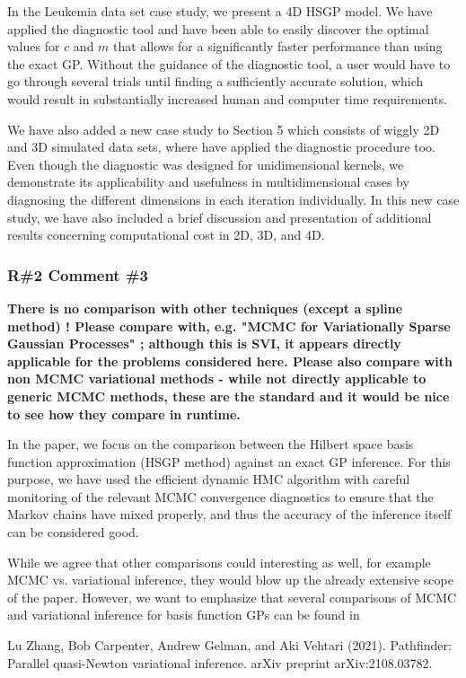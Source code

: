 \documentclass[11pt]{report}
\begin{document}
In the Leukemia data set case study, we present a 4D HSGP model. We have applied the diagnostic tool and have been able to easily discover the optimal values for $c$ and $m$ that allows for a significantly faster performance than using the exact GP. Without the guidance of the diagnostic tool, a user would have to go through several trials until finding a sufficiently accurate solution, which would result in substantially increased human and computer time requirements.

We have also added a new case study to Section 5 which consists of wiggly 2D and 3D simulated data sets, where have applied the diagnostic procedure too. Even though the diagnostic was designed for unidimensional kernels, we demonstrate its applicability and usefulness in multidimensional cases by diagnosing the different dimensions in each iteration individually. 
In this new case study, we have also included a brief discussion and presentation of additional results concerning computational cost in 2D, 3D, and 4D.


\subsubsection*{R\#2 Comment \#3}

\textbf{There is no comparison with other techniques (except a spline method) ! Please compare with, e.g. "MCMC for Variationally Sparse Gaussian Processes" ; although this is SVI, it appears directly applicable for the problems considered here. Please also compare with non MCMC variational methods - while not directly applicable to generic MCMC methods, these are the standard and it would be nice to see how they compare in runtime.}

In the paper, we focus on the comparison between the Hilbert space basis function approximation (HSGP method) against an exact GP inference. 
For this purpose, we have used the efficient dynamic HMC algorithm with careful monitoring of the relevant MCMC convergence diagnostics to ensure that the Markov chains have mixed properly, and thus the accuracy of the inference itself can be considered good. 

While we agree that other comparisons could interesting as well, for example MCMC vs. variational inference, they would blow up the already extensive scope of the paper. However, we want to emphasize that several comparisons of MCMC and variational inference for basis function GPs can be found in

Lu Zhang, Bob Carpenter, Andrew Gelman, and Aki Vehtari (2021). Pathfinder: Parallel quasi-Newton variational inference. arXiv preprint arXiv:2108.03782.
\end{document}
